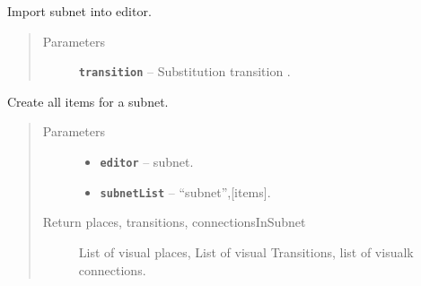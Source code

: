 \documentclass[a4paper,10pt,english]{sphinxmanual}
\begin{document}
\begin{fulllineitems}
\begin{fulllineitems}
\end{fulllineitems}


\begin{fulllineitems}
\label{gui_link:gui.MainWindow.MainWindow.importSubnet}
Import subnet into editor.
\begin{quote}\begin{description}
\item[{Parameters}] \leavevmode
\textbf{\texttt{transition}} -- Substitution transition .

\end{description}\end{quote}

\end{fulllineitems}


\begin{fulllineitems}
\label{gui_link:gui.MainWindow.MainWindow.initNetFromFile}
Create all items for a subnet.
\begin{quote}\begin{description}
\item[{Parameters}] \leavevmode\begin{itemize}
\item {} 
\textbf{\texttt{editor}} --  subnet.

\item {} 
\textbf{\texttt{subnetList}} -- ``subnet'',{[}items{]}.

\end{itemize}

\item[{Return places, transitions, connectionsInSubnet}] \leavevmode
List of visual places, List of visual Transitions, list of visualk connections.

\end{description}\end{quote}

\end{fulllineitems}



\end{fulllineitems}
\end{document}
